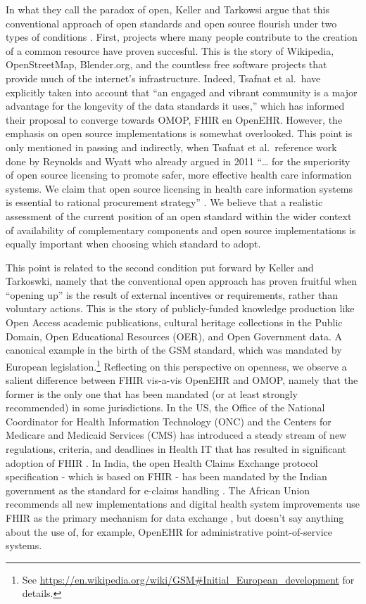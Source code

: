 \documentclass[
  authoryear]{elsarticle}
\begin{document}
In what they call the paradox of open, Keller and Tarkowsi argue that
this conventional approach of open standards and open source flourish
under two types of conditions \citep{keller2021paradox}. First, projects
where many people contribute to the creation of a common resource have
proven succesful. This is the story of Wikipedia, OpenStreetMap,
Blender.org, and the countless free software projects that provide much
of the internet's infrastructure. Indeed, Tsafnat et al.~have explicitly
taken into account that ``an engaged and vibrant community is a major
advantage for the longevity of the data standards it uses,'' which has
informed their proposal to converge towards OMOP, FHIR en OpenEHR.
However, the emphasis on open source implementations is somewhat
overlooked. This point is only mentioned in passing and indirectly, when
Tsafnat et al.~reference work done by Reynolds and Wyatt who already
argued in 2011 ``\ldots{} for the superiority of open source licensing
to promote safer, more effective health care information systems. We
claim that open source licensing in health care information systems is
essential to rational procurement strategy'' \citep{reynolds2011open}.
We believe that a realistic assessment of the current position of an
open standard within the wider context of availability of complementary
components and open source implementations is equally important when
choosing which standard to adopt.

This point is related to the second condition put forward by Keller and
Tarkoswki, namely that the conventional open approach has proven
fruitful when ``opening up'' is the result of external incentives or
requirements, rather than voluntary actions. This is the story of
publicly-funded knowledge production like Open Access academic
publications, cultural heritage collections in the Public Domain, Open
Educational Resources (OER), and Open Government data. A canonical
example in the birth of the GSM standard, which was mandated by European
legislation.\footnote{See
  \url{https://en.wikipedia.org/wiki/GSM\#Initial_European_development}
  for details.} Reflecting on this perspective on openness, we observe a
salient difference between FHIR vis-a-vis OpenEHR and OMOP, namely that
the former is the only one that has been mandated (or at least strongly
recommended) in some jurisdictions. In the US, the Office of the
National Coordinator for Health Information Technology (ONC) and the
Centers for Medicare and Medicaid Services (CMS) has introduced a steady
stream of new regulations, criteria, and deadlines in Health IT that has
resulted in significant adoption of FHIR \citep{firely2023fhir}. In
India, the open Health Claims Exchange protocol specification - which is
based on FHIR - has been mandated by the Indian government as the
standard for e-claims handling \citep{india2020national, hcx}. The
African Union recommends all new implementations and digital health
system improvements use FHIR as the primary mechanism for data exchange
\citep{tilahun2023african}, but doesn't say anything about the use of,
for example, OpenEHR for administrative point-of-service systems.
\end{document}
